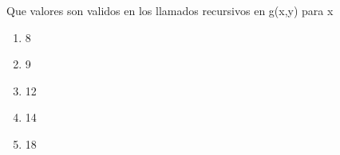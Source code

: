 {
Que valores son validos en los llamados recursivos en g(x,y) para x
\begin{enumerate}
	\item 8
	\item 9
	\item 12
	\item 14
	\item 18
\end{enumerate}
}

